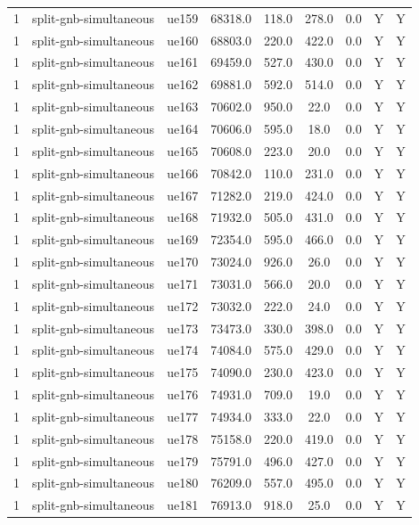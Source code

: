 \begin{table}[ht]
\begin{tabular}{|c|c|c|c|c|c|c|c|c|}
1 & split-gnb-simultaneous & ue159 & 68318.0 & 118.0 & 278.0 & 0.0 & Y & Y \\
1 & split-gnb-simultaneous & ue160 & 68803.0 & 220.0 & 422.0 & 0.0 & Y & Y \\
1 & split-gnb-simultaneous & ue161 & 69459.0 & 527.0 & 430.0 & 0.0 & Y & Y \\
1 & split-gnb-simultaneous & ue162 & 69881.0 & 592.0 & 514.0 & 0.0 & Y & Y \\
1 & split-gnb-simultaneous & ue163 & 70602.0 & 950.0 & 22.0 & 0.0 & Y & Y \\
1 & split-gnb-simultaneous & ue164 & 70606.0 & 595.0 & 18.0 & 0.0 & Y & Y \\
1 & split-gnb-simultaneous & ue165 & 70608.0 & 223.0 & 20.0 & 0.0 & Y & Y \\
1 & split-gnb-simultaneous & ue166 & 70842.0 & 110.0 & 231.0 & 0.0 & Y & Y \\
1 & split-gnb-simultaneous & ue167 & 71282.0 & 219.0 & 424.0 & 0.0 & Y & Y \\
1 & split-gnb-simultaneous & ue168 & 71932.0 & 505.0 & 431.0 & 0.0 & Y & Y \\
1 & split-gnb-simultaneous & ue169 & 72354.0 & 595.0 & 466.0 & 0.0 & Y & Y \\
1 & split-gnb-simultaneous & ue170 & 73024.0 & 926.0 & 26.0 & 0.0 & Y & Y \\
1 & split-gnb-simultaneous & ue171 & 73031.0 & 566.0 & 20.0 & 0.0 & Y & Y \\
1 & split-gnb-simultaneous & ue172 & 73032.0 & 222.0 & 24.0 & 0.0 & Y & Y \\
1 & split-gnb-simultaneous & ue173 & 73473.0 & 330.0 & 398.0 & 0.0 & Y & Y \\
1 & split-gnb-simultaneous & ue174 & 74084.0 & 575.0 & 429.0 & 0.0 & Y & Y \\
1 & split-gnb-simultaneous & ue175 & 74090.0 & 230.0 & 423.0 & 0.0 & Y & Y \\
1 & split-gnb-simultaneous & ue176 & 74931.0 & 709.0 & 19.0 & 0.0 & Y & Y \\
1 & split-gnb-simultaneous & ue177 & 74934.0 & 333.0 & 22.0 & 0.0 & Y & Y \\
1 & split-gnb-simultaneous & ue178 & 75158.0 & 220.0 & 419.0 & 0.0 & Y & Y \\
1 & split-gnb-simultaneous & ue179 & 75791.0 & 496.0 & 427.0 & 0.0 & Y & Y \\
1 & split-gnb-simultaneous & ue180 & 76209.0 & 557.0 & 495.0 & 0.0 & Y & Y \\
1 & split-gnb-simultaneous & ue181 & 76913.0 & 918.0 & 25.0 & 0.0 & Y & Y \\

\end{tabular}
\end{table}
